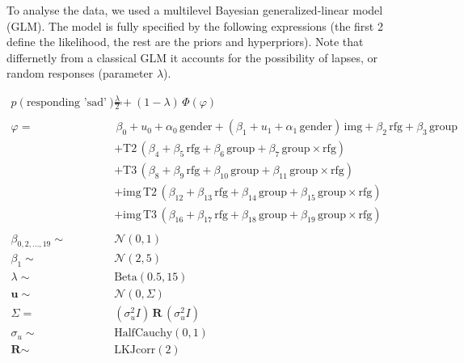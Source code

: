 \documentclass[]{article}
\begin{document}
To analyse the data, we used a multilevel Bayesian generalized-linear
model (GLM). The model is fully specified by the following expressions
(the first 2 define the likelihood, the rest are the priors and
hyperpriors). Note that differnetly from a classical GLM it accounts for
the possibility of lapses, or random responses (parameter \(\lambda\)).

\begin{align*}
 p(\text{responding 'sad'}) = & \frac{\lambda}{2} + (1 - \lambda) \, \Phi \left(\varphi \right)  \\
 \, \\
\varphi =  & \,  \beta_0  + u_0 + \alpha_0 \, \text{gender} + \left(\beta_1 +  u_1 + \alpha_1 \, \text{gender}\right)\, \text{img} +\beta_2\, \text{rfg} + \beta_3 \, \text{group} \\
& + \text{T2} \, \left(\beta_4 +\beta_5 \, \text{rfg} + \beta_6 \, \text{group} + \beta_7 \, \text{group} \times \text{rfg} \right) \\
& + \text{T3} \, \left(\beta_8 +\beta_9 \, \text{rfg} + \beta_{10} \, \text{group} + \beta_{11} \, \text{group} \times \text{rfg} \right)\\
& + \text{img} \, \text{T2} \, \left(\beta_{12} +\beta_{13} \, \text{rfg} + \beta_{14} \, \text{group} + \beta_{15} \, \text{group} \times \text{rfg} \right) \\
& + \text{img} \, \text{T3} \, \left(\beta_{16} +\beta_{17} \, \text{rfg} + \beta_{18} \, \text{group} + \beta_{19} \, \text{group} \times \text{rfg} \right)\\
\, \\
\beta_{0, 2, \dots, 19} \sim & \mathcal{N}\left(0, 1 \right) \\
\beta_1 \sim & \mathcal{N}\left(2, 5 \right) \\
\lambda \sim & \text{Beta} \left(0.5, 15 \right)\\
\mathbf{u} \sim & \mathcal{N}\left(0, \Sigma \right) \\
\Sigma  = & \left(\sigma_u^2 \textit{I} \right) \, \textbf{R} \, \left( \sigma_u^2 \textit{I} \right) \\
\sigma_u  \sim & \text{HalfCauchy} \left(0, 1\right)\\
\textbf{R} \sim & \text{LKJcorr} \left( 2 \right)
\end{align*}
\end{document}
